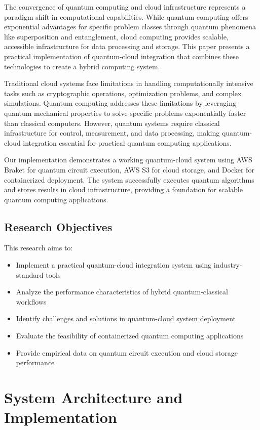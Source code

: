 \documentclass[conference]{IEEEtran}
\begin{document}
The convergence of quantum computing and cloud infrastructure represents a paradigm shift in computational capabilities. While quantum computing offers exponential advantages for specific problem classes through quantum phenomena like superposition and entanglement, cloud computing provides scalable, accessible infrastructure for data processing and storage. This paper presents a practical implementation of quantum-cloud integration that combines these technologies to create a hybrid computing system.

Traditional cloud systems face limitations in handling computationally intensive tasks such as cryptographic operations, optimization problems, and complex simulations. Quantum computing addresses these limitations by leveraging quantum mechanical properties to solve specific problems exponentially faster than classical computers. However, quantum systems require classical infrastructure for control, measurement, and data processing, making quantum-cloud integration essential for practical quantum computing applications.

Our implementation demonstrates a working quantum-cloud system using AWS Braket for quantum circuit execution, AWS S3 for cloud storage, and Docker for containerized deployment. The system successfully executes quantum algorithms and stores results in cloud infrastructure, providing a foundation for scalable quantum computing applications.

\subsection{Research Objectives}
This research aims to:
\begin{itemize}
    \item Implement a practical quantum-cloud integration system using industry-standard tools
    \item Analyze the performance characteristics of hybrid quantum-classical workflows
    \item Identify challenges and solutions in quantum-cloud system deployment
    \item Evaluate the feasibility of containerized quantum computing applications
    \item Provide empirical data on quantum circuit execution and cloud storage performance
\end{itemize}

\section{System Architecture and Implementation}
\end{document}
